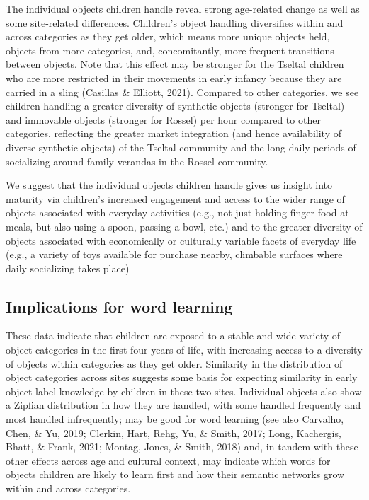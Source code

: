 \documentclass[10pt, letterpaper]{article}
\begin{document}
The individual objects children handle reveal strong age-related change
as well as some site-related differences. Children's object handling
diversifies within and across categories as they get older, which means
more unique objects held, objects from more categories, and,
concomitantly, more frequent transitions between objects. Note that this
effect may be stronger for the Tseltal children who are more restricted
in their movements in early infancy because they are carried in a sling
(Casillas \& Elliott, 2021). Compared to other categories, we see
children handling a greater diversity of synthetic objects (stronger for
Tseltal) and immovable objects (stronger for Rossel) per hour compared
to other categories, reflecting the greater market integration (and
hence availability of diverse synthetic objects) of the Tseltal
community and the long daily periods of socializing around family
verandas in the Rossel community.

We suggest that the individual objects children handle gives us insight
into maturity via children's increased engagement and access to the
wider range of objects associated with everyday activities (e.g., not
just holding finger food at meals, but also using a spoon, passing a
bowl, etc.) and to the greater diversity of objects associated with
economically or culturally variable facets of everyday life (e.g., a
variety of toys available for purchase nearby, climbable surfaces where
daily socializing takes place)

\hypertarget{implications-for-word-learning}{%
\subsection{Implications for word
learning}\label{implications-for-word-learning}}

These data indicate that children are exposed to a stable and wide
variety of object categories in the first four years of life, with
increasing access to a diversity of objects within categories as they
get older. Similarity in the distribution of object categories across
sites suggests some basis for expecting similarity in early object label
knowledge by children in these two sites. Individual objects also show a
Zipfian distribution in how they are handled, with some handled
frequently and most handled infrequently; may be good for word learning
(see also Carvalho, Chen, \& Yu, 2019; Clerkin, Hart, Rehg, Yu, \&
Smith, 2017; Long, Kachergis, Bhatt, \& Frank, 2021; Montag, Jones, \&
Smith, 2018) and, in tandem with these other effects across age and
cultural context, may indicate which words for objects children are
likely to learn first and how their semantic networks grow within and
across categories.
\end{document}
